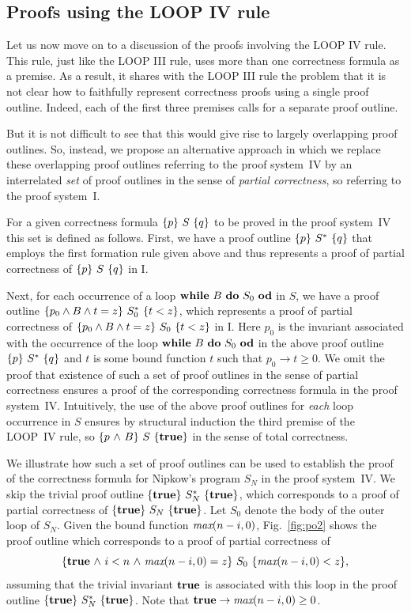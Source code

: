 \documentclass[manuscript, screen, review]{acmart}
\begin{document}
\subsection{Proofs using the LOOP IV rule}

Let us now move on to a discussion of the proofs involving the LOOP IV
rule.  This rule, just like the LOOP III rule, uses more than one
correctness formula as a premise. As a result, it shares with the LOOP
III rule the problem that it is not clear how to faithfully represent
correctness proofs using a single proof outline.
Indeed, each of the first three premises calls for a separate proof
outline.

But it is not difficult to see that this would give rise to largely
overlapping proof outlines.  So, instead, we propose an alternative
approach in which we replace these overlapping proof outlines
referring to the proof system~IV by an interrelated \emph{set} of
proof outlines in the sense of \emph{partial correctness}, so
referring to the proof system~I.

For a given correctness formula $\mbox{$\{{p}\}\ {S}\ \{{q}\}$}$ to be proved in the
proof system~IV this set is defined as follows.  First, we have a
proof outline $\mbox{$\{{p}\}\ {S^*}\ \{{q}\}$}$ that employs the first formation rule
given above and thus represents a proof of partial correctness of
$\mbox{$\{{p}\}\ {S}\ \{{q}\}$}$ in I.

Next, for each occurrence of a loop $\mbox{$\mbox{{\bf while}\ } {B}\ \mbox{{\bf do}\ } {S_0}\ \mbox{{\bf od}}$}$ in $S$, we have a
proof outline $\mbox{$\{{p_0\wedge B \wedge t=z}\}\ {S^*_0}\ \{{t<z}\}$}$, which
represents a proof of partial correctness of
$\mbox{$\{{p_0\wedge B \wedge t=z}\}\ {S_0}\ \{{t<z}\}$}$ in I. Here $p_0$ is the
invariant associated with the occurrence of the loop $\mbox{$\mbox{{\bf while}\ } {B}\ \mbox{{\bf do}\ } {S_0}\ \mbox{{\bf od}}$}$ in
the above proof outline $\mbox{$\{{p}\}\ {S^*}\ \{{q}\}$}$ and $t$ is some bound
function $t$ such that $p_0\to t\geq 0$.  We omit the proof that
existence of such a set of proof outlines in the sense of partial
correctness ensures a proof of the corresponding correctness formula
in the proof system~IV.  Intuitively, the use of the above proof
outlines for \emph{each} loop occurrence in $S$ ensures by structural
induction the third premise of the LOOP~IV rule, so
$\mbox{$\{{p \mbox{$\ \wedge\ $} B}\}\ {S}\ \{{\mathbf{true}}\}$}$ in the sense of total correctness.

We illustrate how such a set of proof outlines can be used to
establish the proof of the correctness formula  
for Nipkow's program $S_N$ in
the proof system~IV.  We skip the trivial proof outline
$\mbox{$\{{\mbox{{\bf true}}}\}\ {S^*_N}\ \{{\mbox{{\bf true}}}\}$}$, which corresponds to a proof of partial
correctness of $\mbox{$\{{\mbox{{\bf true}}}\}\ {S_N}\ \{{\mbox{{\bf true}}}\}$}$.  Let $S_0$ denote the body of the
outer loop of $S_N$.  Given the bound function
$\mbox{\it max}(n-i,0)$, Fig.~\ref{fig:po2} shows the proof outline
which corresponds to a proof of  partial correctness of
$$\mbox{$\{{\mbox{{\bf true}}\mbox{$\ \wedge\ $} i < n \mbox{$\ \wedge\ $} \mbox{\it max}(n-i,0) = z}\}\ {S_0}\ \{{\mbox{\it max}(n-i,0) < z}\}$},$$
assuming that the trivial invariant $\mbox{{\bf true}}$ is associated with this loop
in the proof outline $\mbox{$\{{\mbox{{\bf true}}}\}\ {S^*_N}\ \{{\mbox{{\bf true}}}\}$}$.  Note that
$\mbox{{\bf true}}\to \mbox{\it max}(n-i,0)\geq 0$.
 
\end{document}
